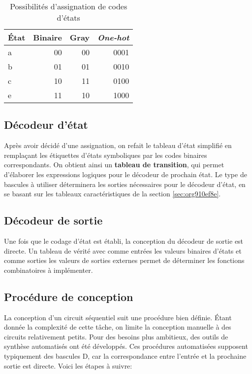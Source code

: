 \documentclass[11pt]{article}
\begin{document}
\begin{table}[htbp]
\caption{\label{tab:orgcdf4890}Possibilités d'assignation de codes d'états}
\centering
\begin{tabular}{lrrr}
État & Binaire & Gray & \emph{One-hot}\\[0pt]
\hline
a & 00 & 00 & 0001\\[0pt]
b & 01 & 01 & 0010\\[0pt]
c & 10 & 11 & 0100\\[0pt]
e & 11 & 10 & 1000\\[0pt]
\end{tabular}
\end{table}

\subsection{Décodeur d'état}
\label{sec:orgd479854}

Après avoir décidé d'une assignation, on refait le tableau d'état
simplifié en remplaçant les étiquettes d'états symboliques par les
codes binaires correspondants. On obtient ainsi un \textbf{tableau de
transition}, qui permet d'élaborer les expressions logiques pour le
décodeur de prochain état. Le type de bascules à utiliser déterminera
les sorties nécessaires pour le décodeur d'état, en se basant sur les
tableaux caractéristiques de la section \ref{sec:org910ef8e}.

\subsection{Décodeur de sortie}
\label{sec:org07a2768}

Une fois que le codage d'état est établi, la conception du décodeur de
sortie est directe. Un tableau de vérité avec comme entrées les
valeurs binaires d'états et comme sorties les valeurs de sorties
externes permet de déterminer les fonctions combinatoires à
implémenter.

\subsection{Procédure de conception}
\label{sec:orgafd02d9}

La conception d'un circuit séquentiel suit une procédure bien
définie. Étant donnée la complexité de cette tâche, on limite la
conception manuelle à des circuits relativement petits. Pour des
besoins plus ambitieux, des outils de synthèse automatisés ont été
développés. Ces procédures automatisées supposent typiquement des
bascules D, car la correspondance entre l'entrée et la prochaine
sortie est directe. Voici les étapes à suivre:
\end{document}
